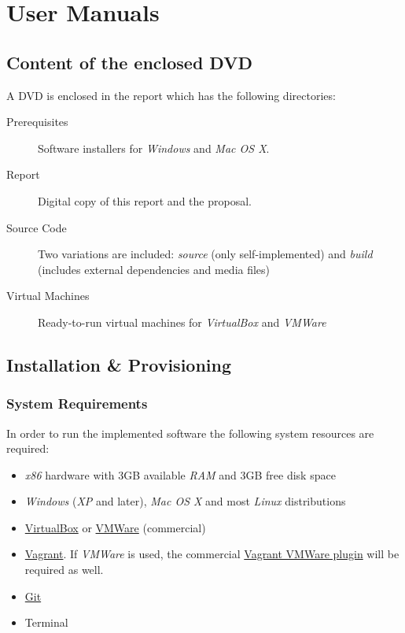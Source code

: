 \section{User Manuals}

\subsection{Content of the enclosed DVD}

A DVD is enclosed in the report which has the following directories:

\begin{description}
    \item[Prerequisites] Software installers for \emph{Windows} and \emph{Mac OS X}.
    \item[Report] Digital copy of this report and the proposal.
    \item[Source Code] Two variations are included: \emph{source} (only self-implemented) and \emph{build} (includes external dependencies and media files)
    \item[Virtual Machines] Ready-to-run virtual machines for \emph{VirtualBox} and \emph{VMWare}
\end{description}

\subsection{Installation \& Provisioning}

\subsubsection{System Requirements}

In order to run the implemented software the following system resources are required:

\begin{itemize}
\item \emph{x86} hardware with 3GB available \emph{RAM} and 3GB free disk space
\item \emph{Windows} (\emph{XP} and later), \emph{Mac OS X} and most \emph{Linux} distributions
\item \href{https://www.virtualbox.org/wiki/Downloads}{VirtualBox} or \href{http://www.vmware.com/products/fusion/}{VMWare} (commercial)
\item \href{http://www.vagrantup.com/downloads.html}{Vagrant}. If \emph{VMWare} is used, the commercial \href{https://www.vagrantup.com/vmware}{Vagrant VMWare plugin} will be required as well.
\item \href{https://git-scm.com/}{Git}
\item Terminal
\end{itemize}

